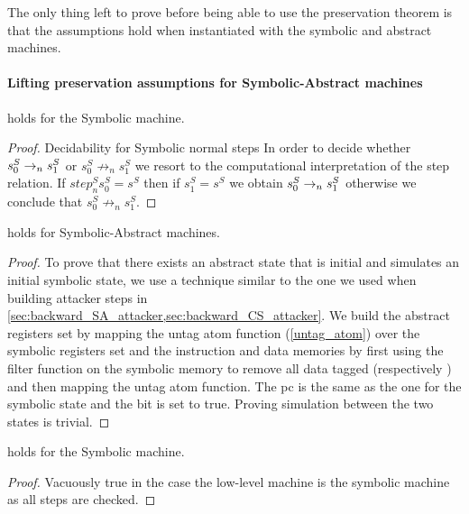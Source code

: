 The only thing left to prove before being able to use the \CFI
preservation theorem is that the
assumptions  hold when
instantiated with the symbolic and abstract machines.

\paragraph{Lifting preservation assumptions for Symbolic-Abstract machines}

\begin{lemma}
  \label{step_classic_symbolic}
   holds for the Symbolic machine.
\end{lemma}
\begin{proof}
  Decidability for Symbolic normal steps
  In order to decide whether $s^S_0\to_ns^S_1$ or
  $s^S_0 \not \to_n s^S_1$ we resort to the computational interpretation
  of the step relation. If $step^S_n s^S_0 = s^S$ then if 
  $s^S_1 = s^S$ we obtain $s^S_0\to_ns^S_1$ otherwise
  we conclude that $s^S_0 \not \to_n s^S_1$.
\end{proof}
\begin{lemma}
  \label{initial_refine_SA}
   holds for Symbolic-Abstract machines.
\end{lemma}
\begin{proof}
  To prove that there exists an abstract
  state that is initial and simulates an initial symbolic state, we
  use a technique similar to the one we used when building attacker
  steps in \cref{sec:backward_SA_attacker,sec:backward_CS_attacker}.
  We build the abstract registers set by mapping the untag atom
  function (\cref{untag_atom}) over the symbolic registers set and the
  instruction and data memories by first using the filter function on
  the symbolic memory to remove all data tagged \DATAname
  (respectively \INSTRname) and then mapping the untag atom function.
  The pc is the same as the one for the symbolic state and the \ok bit
  is set to true. Proving simulation between the two states is trivial.
\end{proof}

\begin{lemma}
  \label{cfg_nocheck_SA}
   holds for the Symbolic machine.
\end{lemma}
\begin{proof}
  Vacuously true in the case the low-level machine is
  the symbolic machine as all steps are checked.
\end{proof}

